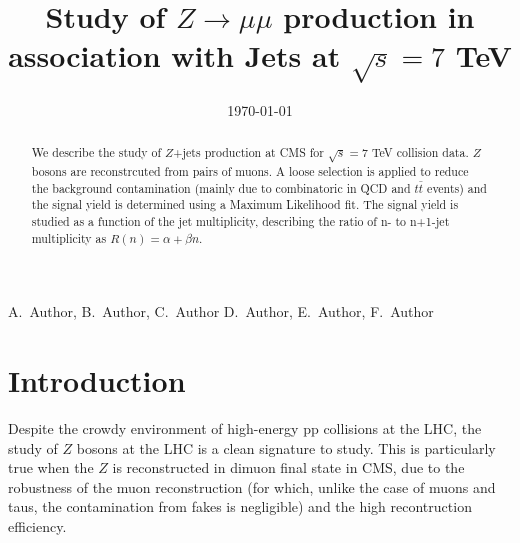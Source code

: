 \documentclass{cmspaper}
\begin{document}
\begin{titlepage}

   \date{\today}

   \title{Study of $Z\rightarrow \mu\mu$ production in association with Jets at $\sqrt{s}=7$ TeV}

   \begin{Authlist}
    A.~Author, B.~Author, C.~Author
    D.~Author, E.~Author, F.~Author
   \end{Authlist}


  \begin{abstract}
    We describe the study of $Z$+jets production at CMS for
    $\sqrt{s}=7$ TeV collision data.  $Z$ bosons are reconstrcuted
    from pairs of muons. A loose selection is applied to reduce the
    background contamination (mainly due to combinatoric in QCD and
    $t\bar t$ events) and the signal yield is determined using a
    Maximum Likelihood fit. The signal yield is studied as a function
    of the jet multiplicity, describing the ratio of n- to n+1-jet
    multiplicity as $R(n) = \alpha + \beta n$.
  \end{abstract}

\end{titlepage}

\setcounter{page}{2}

\section{Introduction}



Despite the crowdy environment of high-energy pp collisions at the LHC,
the study of $Z$ bosons at the LHC is a clean signature to study. 
This is particularly true when the $Z$ is reconstructed in dimuon
final state in CMS, due to the robustness of the muon reconstruction
(for which, unlike the case of muons and taus, the contamination from
fakes is negligible) and the high recontruction efficiency.
\end{document}
